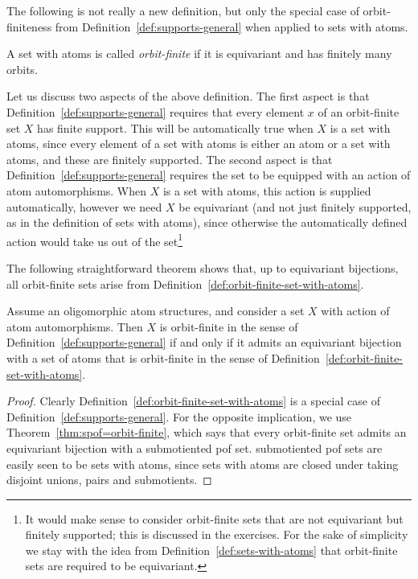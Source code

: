 \label{sec:hereditary-orbit-finite-sets}

The following is not really a new definition, but only the special case of orbit-finiteness from Definition~\ref{def:supports-general} when applied to sets with atoms. 



\begin{definition}\label{def:orbit-finite-set-with-atoms}
	A set with atoms is called \emph{orbit-finite} if it is equivariant and has finitely many orbits.
\end{definition}

Let us discuss two aspects  of the above definition. The first aspect is that  Definition~\ref{def:supports-general} requires that every element $x$ of an orbit-finite set $X$ has finite support. This will be automatically  true when $X$ is a set with atoms, since every element of a set with atoms is either an atom or a set with atoms, and these are finitely supported. The second aspect is  that Definition~\ref{def:supports-general} requires the set to be equipped with an action of atom automorphisms. When $X$ is a set with atoms, this action is supplied automatically, however we need $X$ be equivariant (and not just finitely supported, as in the definition of sets with atoms), since otherwise the automatically defined action would take us out of the set\footnote{It would make sense to consider orbit-finite sets that are not equivariant but finitely supported; this  is discussed in the exercises. For the sake of simplicity we stay with the idea from Definition~\ref{def:sets-with-atoms} that orbit-finite sets are required to be equivariant.}


The following straightforward theorem shows that, up to equivariant bijections,  all orbit-finite sets arise from Definition~\ref{def:orbit-finite-set-with-atoms}. 

\begin{theorem}
	Assume an oligomorphic atom structures, and consider a set $X$ with action of atom automorphisms. Then $X$ is orbit-finite in the sense of Definition~\ref{def:supports-general} if and only if it admits an equivariant bijection with a set of atoms that is orbit-finite in the sense of Definition~\ref{def:orbit-finite-set-with-atoms}.
\end{theorem}
\begin{proof}
	Clearly Definition~\ref{def:orbit-finite-set-with-atoms} is a special case of Definition~\ref{def:supports-general}. For the opposite  implication, we use  Theorem~\ref{thm:spof=orbit-finite}, which says that every orbit-finite set admits an equivariant bijection with a submotiented pof set. submotiented pof sets are easily seen to be sets with atoms, since sets with atoms are closed under taking disjoint unions, pairs and submotients. 
\end{proof}



